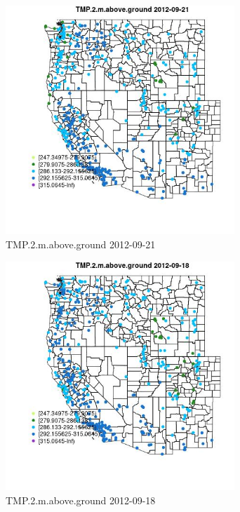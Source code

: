 \begin{figure} 
\centering  
\includegraphics[width=0.77\textwidth]{Code_Outputs/Report_ML_input_PM25_Step4_part_e_de_duplicated_aves_compiled_2019-05-14wNAs_MapObsTMP2maboveground2012-09-21.jpg} 
\caption{\label{fig:Report_ML_input_PM25_Step4_part_e_de_duplicated_aves_compiled_2019-05-14wNAsMapObsTMP2maboveground2012-09-21}TMP.2.m.above.ground 2012-09-21} 
\end{figure} 
 

\begin{figure} 
\centering  
\includegraphics[width=0.77\textwidth]{Code_Outputs/Report_ML_input_PM25_Step4_part_e_de_duplicated_aves_compiled_2019-05-14wNAs_MapObsTMP2maboveground2012-09-18.jpg} 
\caption{\label{fig:Report_ML_input_PM25_Step4_part_e_de_duplicated_aves_compiled_2019-05-14wNAsMapObsTMP2maboveground2012-09-18}TMP.2.m.above.ground 2012-09-18} 
\end{figure} 
 

